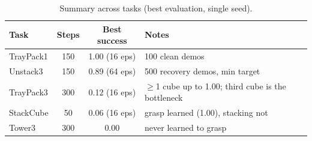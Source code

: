 \begin{table}[t]
  \centering
  \caption{Summary across tasks (best evaluation, single seed).}
  \label{tab:summary}
  \small
  \begin{tabular}{lccl}
    \toprule
    Task & Steps & Best success & Notes \\
    \midrule
    TrayPack1  & 150 & 1.00 (16 eps) & 100 clean demos \\
    Unstack3   & 150 & 0.89 (64 eps) & 500 recovery demos, min target \\
    TrayPack3  & 300 & 0.12 (16 eps) & $\geq$1 cube up to 1.00; third cube is the bottleneck \\
    StackCube  & 50  & 0.06 (16 eps) & grasp learned (1.00), stacking not \\
    Tower3     & 300 & 0.00          & never learned to grasp \\
    \bottomrule
  \end{tabular}
\end{table}
